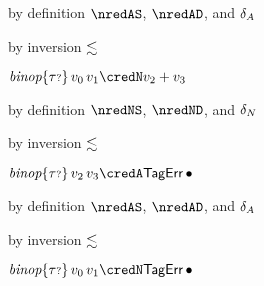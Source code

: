 {\begin{lamportproof*}
    \begin{pfproof}
        \begin{pfproof}
          by definition $\nredAS$, $\nredAD$, and $\delta_{A}$
        \end{pfproof}
        \begin{pfproof}
          by inversion $\lesssim$
        \end{pfproof}
      \qedstep
        \begin{pfproof}
          $\ebinopt{\stoptional}{\svalue_0}{\svalue_1} \credN \svalue_2 + \svalue_3$
        \end{pfproof}
    \end{pfproof}

    \begin{pfproof}
        \begin{pfproof}
          by definition $\nredNS$, $\nredND$, and $\delta_{N}$
        \end{pfproof}
        \begin{pfproof}
          by inversion $\lesssim$
        \end{pfproof}
      \qedstep
        \begin{pfproof}
          $\ebinopt{\stoptional}{\svalue_2}{\svalue_3} \credA \tagerrorD$
        \end{pfproof}
    \end{pfproof}

    \begin{pfproof}
        \begin{pfproof}
          by definition $\nredAS$, $\nredAD$, and $\delta_{A}$
        \end{pfproof}
        \begin{pfproof}
          by inversion $\lesssim$
        \end{pfproof}
      \qedstep
        \begin{pfproof}
          $\ebinopt{\stoptional}{\svalue_0}{\svalue_1} \credN \tagerrorD$
        \end{pfproof}
    \end{pfproof}


\end{lamportproof*}}
